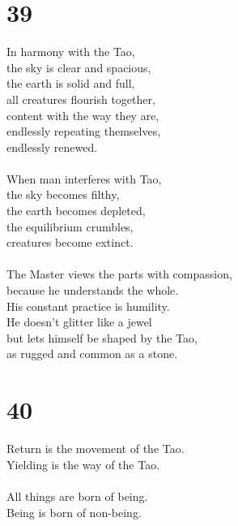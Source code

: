 \documentclass[b5paper, 12pt, oneside]{book}
\begin{document}
\chapter*{39}
In harmony with the Tao,\\
the sky is clear and spacious,\\
the earth is solid and full,\\
all creatures flourish together,\\
content with the way they are,\\
endlessly repeating themselves,\\
endlessly renewed.\\
\\
When man interferes with Tao,\\
the sky becomes filthy,\\
the earth becomes depleted,\\
the equilibrium crumbles,\\
creatures become extinct.\\
\\
The Master views the parts with compassion,\\
because he understands the whole.\\
His constant practice is humility.\\
He doesn't glitter like a jewel\\
but lets himself be shaped by the Tao,\\
as rugged and common as a stone.\\

\chapter*{40}
Return is the movement of the Tao.\\
Yielding is the way of the Tao.\\
\\
All things are born of being.\\
Being is born of non-being.\\
\end{document}
